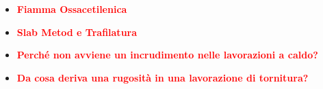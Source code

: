\documentclass[a4paper, 15pt]{article}
\begin{document}
\begin{itemize}
\item
\textcolor{red}{\textbf{Fiamma Ossacetilenica}}\\





\item
\textcolor{red}{\textbf{Slab Metod e Trafilatura}}\\





\item
\textcolor{red}{\textbf{Perché non avviene un incrudimento nelle lavorazioni a caldo?}}\\





\item
\textcolor{red}{\textbf{Da cosa deriva una rugosità in una lavorazione di tornitura?}}\\
	
	
	

\end{itemize}
\end{document}
